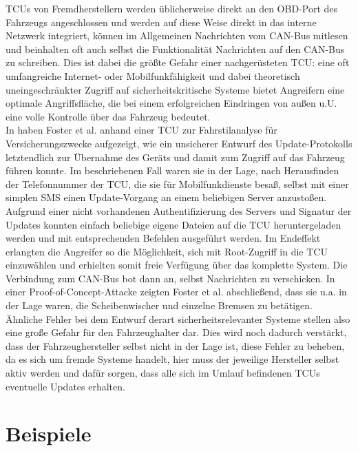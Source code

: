 \documentclass[
    fontsize=12pt,
    headings=small,
    parskip=half,           %
    bibliography=totoc,9
    numbers=noenddot,       %
    open=any,               %
    ]{scrreprt}
\begin{document}
TCUs von Fremdherstellern werden üblicherweise direkt an den OBD-Port des Fahrzeugs angeschlossen und werden auf diese Weise direkt in das interne Netzwerk integriert, können im Allgemeinen Nachrichten vom CAN-Bus mitlesen und beinhalten oft auch selbst die Funktionalität Nachrichten auf den CAN-Bus zu schreiben.
Dies ist dabei die größte Gefahr einer nachgerüsteten TCU: eine oft umfangreiche Internet- oder Mobilfunkfähigkeit und dabei theoretisch uneingeschränkter Zugriff auf sicherheitskritische Systeme bietet Angreifern eine optimale Angriffsfläche, die bei einem erfolgreichen Eindringen von außen u.U. eine volle Kontrolle über das Fahrzeug bedeutet. \\
In \cite{FPK15} haben Foster et al. anhand einer TCU zur Fahrstilanalyse für Versicherungszwecke aufgezeigt, wie ein unsicherer Entwurf des Update-Protokolls letztendlich zur Übernahme des Geräts und damit zum Zugriff auf das Fahrzeug führen konnte. Im beschriebenen Fall waren sie in der Lage, nach Herausfinden der Telefonnummer der TCU, die sie für Mobilfunkdienste besaß, selbst mit einer simplen SMS einen Update-Vorgang an einem beliebigen Server anzustoßen.
Aufgrund einer nicht vorhandenen Authentifizierung des Servers und Signatur der Updates konnten einfach beliebige eigene Dateien auf die TCU heruntergeladen werden und mit entsprechenden Befehlen ausgeführt werden. Im Endeffekt erlangten die Angreifer so die Möglichkeit, sich mit Root-Zugriff in die TCU einzuwählen und erhielten somit freie Verfügung über das komplette System. Die Verbindung zum CAN-Bus bot dann an, selbst Nachrichten zu verschicken. In einer Proof-of-Concept-Attacke zeigten Foster et al. abschließend, dass sie u.a. in der Lage waren, die Scheibenwischer und einzelne Bremsen zu betätigen. \\
Ähnliche Fehler bei dem Entwurf derart sicherheitsrelevanter Systeme stellen also eine große Gefahr für den Fahrzeughalter dar. Dies wird noch dadurch verstärkt, dass der Fahrzeughersteller selbst nicht in der Lage ist, diese Fehler zu beheben, da es sich um fremde Systeme handelt, hier muss der jeweilige Hersteller selbst aktiv werden und dafür sorgen, dass alle sich im Umlauf befindenen TCUs eventuelle Updates erhalten.

\section{Beispiele}
\end{document}

